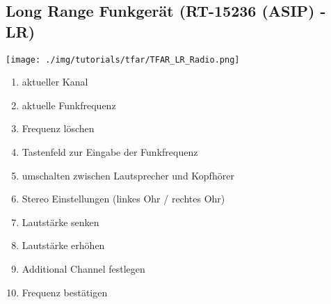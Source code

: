 \subsection{Long Range Funkgerät (RT-15236 (ASIP) - LR)}
\begin{minipage}[t]{1\textwidth}
	\texttt{[image: ./img/tutorials/tfar/TFAR\_LR\_Radio.png]}
\end{minipage}
\begin{enumerate}
	\item aktueller Kanal
	\item aktuelle Funkfrequenz
	\item Frequenz löschen
	\item Tastenfeld zur Eingabe der Funkfrequenz
	\item umschalten zwischen Lautsprecher und Kopfhörer
	\item Stereo Einstellungen (linkes Ohr / rechtes Ohr)
	\item Lautstärke  senken
	\item Lautstärke erhöhen
	\item Additional Channel festlegen
	\item Frequenz bestätigen
\end{enumerate}
